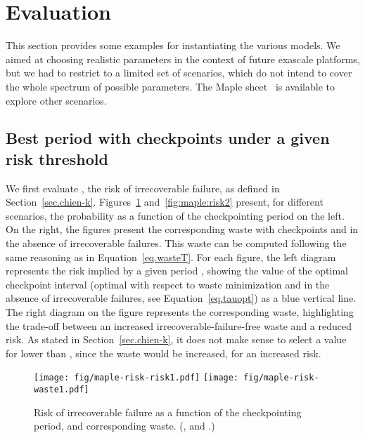 \documentclass[10pt,table]{article}
\begin{document}
\section{Evaluation}
\label{sec.evaluation}

This section provides some examples for instantiating the various
models. We aimed at choosing realistic parameters in the context of
future exascale platforms, but we had to restrict to a limited set of
scenarios, which do not intend to cover the whole spectrum of possible
parameters. The Maple sheet~\cite{webrefmaple} is available to explore
other scenarios.

\subsection{Best period with  checkpoints under a given risk threshold}
\label{sec.evaluation.k}

We first evaluate , the risk of irrecoverable failure, as defined in Section~\ref{sec.chien-k}.
Figures~\ref{fig:maple:risk1} and~\ref{fig:maple:risk2}
present, for different scenarios, the probability  as a function
of the checkpointing period  on the left. On the right, the
figures present the corresponding
waste with  checkpoints and 
in the absence of irrecoverable  failures. This waste can be computed  
following the same reasoning as in Equation~\eqref{eq.wasteT}.
For each figure, the left
diagram represents the risk implied by a given period , showing
the value  of the optimal checkpoint interval (optimal
with respect to waste minimization and in the absence of irrecoverable  failures, 
see Equation~\eqref{eq.tauopt}) as a blue vertical line. The right
diagram on the figure represents the corresponding waste, highlighting
the trade-off between an increased irrecoverable-failure-free waste and a reduced risk. As stated
in Section~\ref{sec.chien-k}, it does not make sense to select a
value for  lower than , since the waste would be
increased, for an increased risk.

\begin{figure}
\begin{center}
\texttt{[image: fig/maple-risk-risk1.pdf]}
\texttt{[image: fig/maple-risk-waste1.pdf]}
\caption{Risk of irrecoverable failure as a function of the checkpointing
  period, and corresponding waste. {\footnotesize(,  and .)}}
\label{fig:maple:risk1}
\end{center}
\end{figure}
\end{document}
